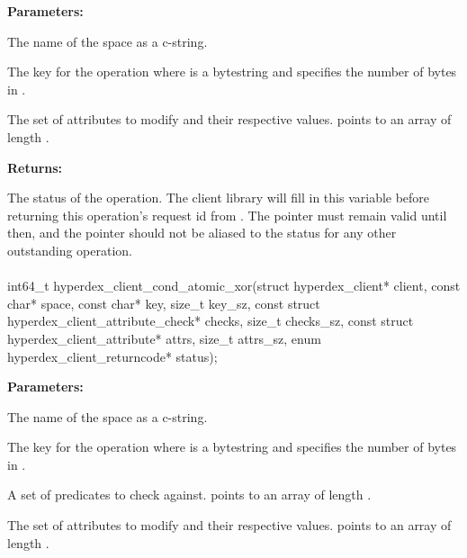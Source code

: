 \noindent\textbf{Parameters:}
\begin{description}[labelindent=\widthof{{\code{attrs}, \code{attrs\_sz}}},leftmargin=*,noitemsep,nolistsep,align=right]
\item[\code{space}] The name of the space as a c-string.
\item[\code{key}, \code{key\_sz}] The key for the operation where  is a bytestring and  specifies the number of bytes in .
\item[\code{attrs}, \code{attrs\_sz}] The set of attributes to modify and their respective values.   points to an array of length .
\end{description}

\noindent\textbf{Returns:}
\begin{description}[labelindent=\widthof{{\code{status}}},leftmargin=*,noitemsep,nolistsep,align=right]
\item[\code{status}] The status of the operation.  The client library will fill in this variable before returning this operation's request id from .  The pointer must remain valid until then, and the pointer should not be aliased to the status for any other outstanding operation.
\end{description}

\paragraph{}
\begin{ccode}
int64_t hyperdex_client_cond_atomic_xor(struct hyperdex_client* client,
                const char* space,
                const char* key, size_t key_sz,
                const struct hyperdex_client_attribute_check* checks, size_t checks_sz,
                const struct hyperdex_client_attribute* attrs, size_t attrs_sz,
                enum hyperdex_client_returncode* status);
\end{ccode}
\funcdesc 

\noindent\textbf{Parameters:}
\begin{description}[labelindent=\widthof{{\code{checks}, \code{checks\_sz}}},leftmargin=*,noitemsep,nolistsep,align=right]
\item[\code{space}] The name of the space as a c-string.
\item[\code{key}, \code{key\_sz}] The key for the operation where  is a bytestring and  specifies the number of bytes in .
\item[\code{checks}, \code{checks\_sz}] A set of predicates to check against.   points to an array of length .
\item[\code{attrs}, \code{attrs\_sz}] The set of attributes to modify and their respective values.   points to an array of length .
\end{description}

